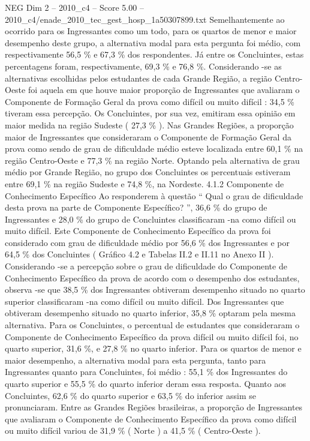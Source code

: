 \begin{textsample}{NEG Dim 2 – 2010\_c4 – Score 5.00 – 2010\_c4/enade\_2010\_tec\_gest\_hosp\_1a50307899.txt}
Semelhantemente ao ocorrido para os Ingressantes como um todo, para os quartos de menor e maior desempenho deste grupo, a alternativa modal para esta pergunta foi médio, com respectivamente 56,5 \% e 67,3 \% dos respondentes.
Já entre os Concluintes, estas percentagens foram, respectivamente, 69,3 \% e 76,8 \%.
Considerando -se as alternativas escolhidas pelos estudantes de cada Grande Região, a região Centro-Oeste foi aquela em que houve maior proporção de Ingressantes que avaliaram o Componente de Formação Geral da prova como difícil ou muito difícil : 34,5 \% tiveram essa percepção.
Os Concluintes, por sua vez, emitiram essa opinião em maior medida na região Sudeste ( 27,3 \% ).
Nas Grandes Regiões, a proporção maior de Ingressantes que consideraram o Componente de Formação Geral da prova como sendo de grau de dificuldade médio esteve localizada entre 60,1 \% na região Centro-Oeste e 77,3 \% na região Norte.
Optando pela alternativa de grau médio por Grande Região, no grupo dos Concluintes os percentuais estiveram entre 69,1 \% na região Sudeste e 74,8 \%, na Nordeste. 4.1.2 Componente de Conhecimento Específico Ao responderem à questão “ Qual o grau de dificuldade desta prova na parte de Componente Específico? ”, 36,6 \% do grupo de Ingressantes e 28,0 \% do grupo de Concluintes classificaram -na como difícil ou muito difícil.
Este Componente de Conhecimento Específico da prova foi considerado com grau de dificuldade médio por 56,6 \% dos Ingressantes e por 64,5 \% dos Concluintes ( Gráfico 4.2 e Tabelas II.2 e II.11 no Anexo II ).
Considerando -se a percepção sobre o grau de dificuldade do Componente de Conhecimento Específico da prova de acordo com o desempenho dos estudantes, observa -se que 38,5 \% dos Ingressantes obtiveram desempenho situado no quarto superior classificaram -na como difícil ou muito difícil.
Dos Ingressantes que obtiveram desempenho situado no quarto inferior, 35,8 \% optaram pela mesma alternativa.
Para os Concluintes, o percentual de estudantes que consideraram o Componente de Conhecimento Específico da prova difícil ou muito difícil foi, no quarto superior, 31,6 \%, e 27,8 \% no quarto inferior.
Para os quartos de menor e maior desempenho, a alternativa modal para esta pergunta, tanto para Ingressantes quanto para Concluintes, foi médio : 55,1 \% dos Ingressantes do quarto superior e 55,5 \% do quarto inferior deram essa resposta.
Quanto aos Concluintes, 62,6 \% do quarto superior e 63,5 \% do inferior assim se pronunciaram.
Entre as Grandes Regiões brasileiras, a proporção de Ingressantes que avaliaram o Componente de Conhecimento Específico da prova como difícil ou muito difícil variou de 31,9 \% ( Norte ) a 41,5 \% ( Centro-Oeste ).

\end{textsample}
